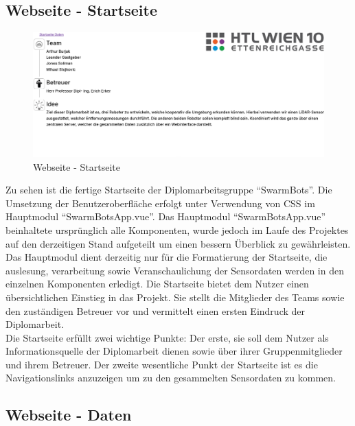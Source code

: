 \subsection{Webseite - Startseite}
\label{subsubsec:Webseite_Startseite}

\begin{figure}[H]
  \includegraphics[width=\textwidth, center]{img/Webseite_Startseite.png}
  \caption{Webseite - Startseite}
  \label{fig:Webseite_Startseite}
\end{figure}

Zu sehen ist die fertige Startseite der Diplomarbeitsgruppe ``SwarmBots''. 
Die Umsetzung der Benutzeroberfläche erfolgt unter Verwendung von CSS im Hauptmodul ``SwarmBotsApp.vue''.
%
Das Hauptmodul ``SwarmBotsApp.vue'' beinhaltete ursprünglich alle Komponenten, wurde jedoch im Laufe des Projektes
auf den derzeitigen Stand aufgeteilt um einen bessern Überblick zu gewährleisten.
%
Das Hauptmodul dient derzeitig nur für die Formatierung der Startseite, die auslesung, verarbeitung 
sowie Veranschaulichung der Sensordaten werden in den einzelnen Komponenten erledigt. 
%
Die Startseite bietet dem Nutzer einen übersichtlichen Einstieg in das Projekt. Sie stellt die Mitglieder des Teams
sowie den zuständigen Betreuer vor und vermittelt einen ersten Eindruck der Diplomarbeit. \\
% 
Die Startseite erfüllt zwei wichtige Punkte: Der erste, sie soll dem Nutzer als Informationsquelle der 
Diplomarbeit dienen sowie über ihrer Gruppenmitglieder und ihrem Betreuer. 
Der zweite wesentliche Punkt der Startseite ist es die Navigationslinks anzuzeigen um zu den 
gesammelten Sensordaten zu kommen. 

\subsection{Webseite - Daten}
\label{subsubsec:Webseite_Daten}

